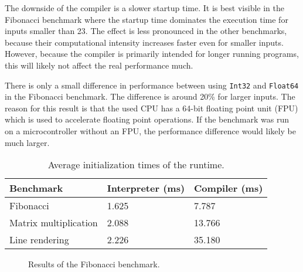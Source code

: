 The downside of the compiler is a slower startup time. It is best visible in the Fibonacci benchmark where the startup time dominates the execution time for inputs smaller than 23. The effect is less pronounced in the other benchmarks, because their computational intensity increases faster even for smaller inputs. However, because the compiler is primarily intended for longer running programs, this will likely not affect the real performance much.

There is only a small difference in performance between using \texttt{Int32} and \texttt{Float64} in the Fibonacci benchmark. The difference is around 20\% for larger inputs. The reason for this result is that the used CPU has a 64-bit floating point unit (FPU) which is used to accelerate floating point operations. If the benchmark was run on a microcontroller without an FPU, the performance difference would likely be much larger.


\begin{table}[!b]
    \centering
    \begin{tabular}{|l|l|l|}
        \hline
        Benchmark             & Interpreter (ms) & Compiler (ms) \\\hline
        Fibonacci             & 1.625            & 7.787         \\
        Matrix multiplication & 2.088            & 13.766        \\
        Line rendering        & 2.226            & 35.180        \\
        \hline
    \end{tabular}
    \caption{Average initialization times of the runtime.}
    \label{tab:init}
\end{table}

\pagebreak

\pgfplotsset{width=1\textwidth,height=0.45\textwidth}

\begin{figure}
    \centering
    \caption{Results of the Fibonacci benchmark.}
    \label{fig:fibRec}
\end{figure}

